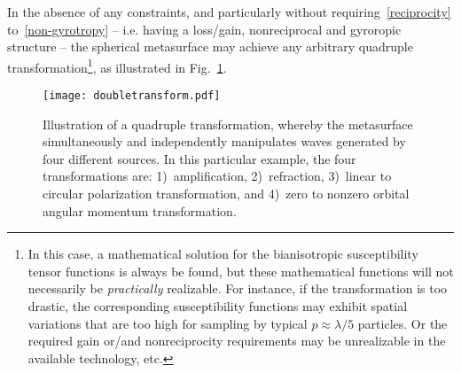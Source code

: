 \documentclass[journal,transaction]{IEEEtran}
\newcommand{\figref}{Fig.~\ref}
\begin{document}
In the absence of any constraints, and particularly without requiring~\eqref{reciprocity} to~\eqref{non-gyrotropy} -- i.e. having a loss/gain, nonreciprocal and gyroropic structure -- the spherical metasurface may achieve any arbitrary quadruple transformation\footnote{In this case, a mathematical solution for the bianisotropic susceptibility tensor functions is always be found, but these mathematical functions will not necessarily be \emph{practically} realizable. For instance, if the transformation is too drastic, the corresponding susceptibility functions may exhibit spatial variations that are too high for sampling by typical $p\approx\lambda/5$ particles. Or the required gain or/and nonreciprocity requirements may be unrealizable in the available technology, etc.}, as illustrated in \figref{FIG:quadrupletransform}.

\begin{figure}[!h]
    \centering
         \texttt{[image: doubletransform.pdf]}{
        }
        \caption{Illustration of a quadruple transformation, whereby the metasurface simultaneously and independently manipulates waves generated by four different sources. In this particular example, the four transformations are: 1)~amplification, 2)~refraction, 3)~linear to circular polarization transformation, and 4)~zero to nonzero orbital angular momentum transformation.}
   \label{FIG:quadrupletransform}
\end{figure}
\end{document}
